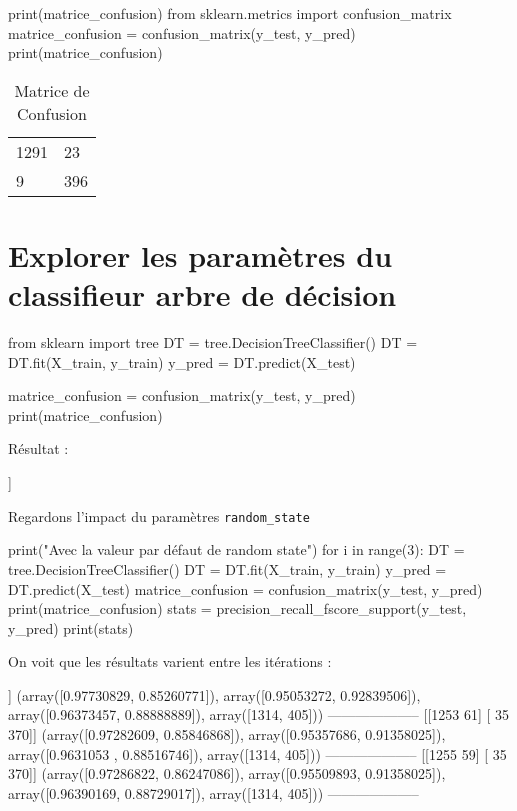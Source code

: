 \begin{python}
print(matrice_confusion)
from sklearn.metrics import confusion_matrix
matrice_confusion = confusion_matrix(y_test, y_pred)
print(matrice_confusion)
\end{python}

\begin{table}
\begin{center}
\begin{tabular}{ll}
1291   &23 \\
   9   &396\\
\end{tabular}
\end{center}
\caption{Matrice de Confusion}
\end{table}

\section{Explorer les paramètres du classifieur arbre de décision} %

\begin{python}
from sklearn import tree
DT = tree.DecisionTreeClassifier()
DT = DT.fit(X_train, y_train)
y_pred = DT.predict(X_test)

matrice_confusion = confusion_matrix(y_test, y_pred)
print(matrice_confusion)
\end{python}

Résultat :

\begin{python}
[[1257   57]
 [  32  373]]
\end{python}


Regardons l'impact du paramètres \texttt{random\_state}

\begin{python}
print("Avec la valeur par défaut de random state")
for i in range(3):
  DT = tree.DecisionTreeClassifier()
  DT = DT.fit(X_train, y_train)
  y_pred = DT.predict(X_test)
  matrice_confusion = confusion_matrix(y_test, y_pred)
  print(matrice_confusion)
  stats = precision_recall_fscore_support(y_test, y_pred)
  print(stats)

\end{python}

On voit que les résultats varient entre les itérations :

\begin{python}
[[1249   65]
 [  29  376]]
(array([0.97730829, 0.85260771]), 
 array([0.95053272, 0.92839506]), 
 array([0.96373457, 0.88888889]), 
 array([1314,  405]))
--------------------
[[1253   61]
 [  35  370]]
(array([0.97282609, 0.85846868]), 
 array([0.95357686, 0.91358025]), 
 array([0.9631053 , 0.88516746]), 
 array([1314,  405]))
--------------------
[[1255   59]
 [  35  370]]
(array([0.97286822, 0.86247086]), 
 array([0.95509893, 0.91358025]), 
 array([0.96390169, 0.88729017]), 
 array([1314,  405]))
--------------------
\end{python}


